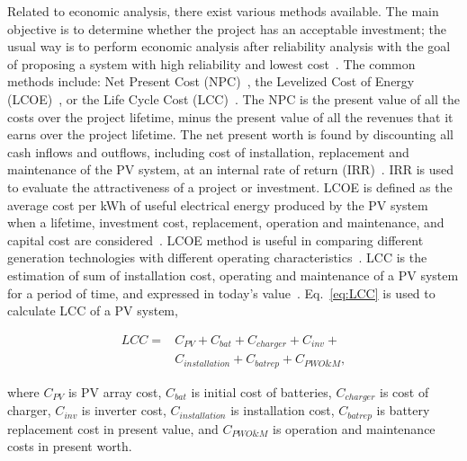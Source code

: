 \documentclass[journal]{IEEEtran}
\begin{document}
Related to economic analysis, there exist various methods available. The main objective is to determine whether the project has an acceptable investment; the usual way is to perform economic analysis after reliability analysis with the goal of proposing a system with high reliability and lowest cost~\cite{Alsadi2018}. The common methods include: Net Present Cost (NPC)~\cite{Park2004}, the Levelized Cost of Energy (LCOE)~\cite{Zhou2010}, or the Life Cycle Cost (LCC)~\cite{Applasamy2011}. The NPC is the present value of all the costs over the project lifetime, minus the present value of all the revenues that it earns over the project lifetime. The net present worth is found by discounting all cash inflows and outflows, including cost of installation, replacement and maintenance of the PV system, at an internal rate of return (IRR)~\cite{Park2004}. IRR is used to evaluate the attractiveness of a project or investment. LCOE is defined as the average cost per kWh of useful electrical energy produced by the PV system when a lifetime, investment cost, replacement, operation and maintenance, and capital cost are considered~\cite{Kamel2005}. LCOE method is useful in comparing different generation technologies with different operating characteristics~\cite{Zhou2010}. LCC is the estimation of sum of installation cost, operating and maintenance of a PV system for a period of time, and expressed in today's value~\cite{Applasamy2011}. Eq.~\eqref{eq:LCC} is used to calculate LCC of a PV system,

\begin{equation}
\label{eq:LCC}
\begin{aligned}
LCC = & C_{PV} + C_{bat} + C_{charger} + C_{inv} + \\
      & C_{installation} + C_{batrep} + C_{PWO\&M},
\end{aligned}
\end{equation}

\noindent where $C_{PV}$ is PV array cost, $C_{bat}$ is initial cost of batteries, $C_{charger}$ is cost of charger, $C_{inv}$ is inverter cost, $C_{installation}$ is installation cost, $C_{batrep}$ is battery replacement cost in present value, and $C_{PWO\&M}$ is operation and maintenance costs 
in present worth.
\end{document}
